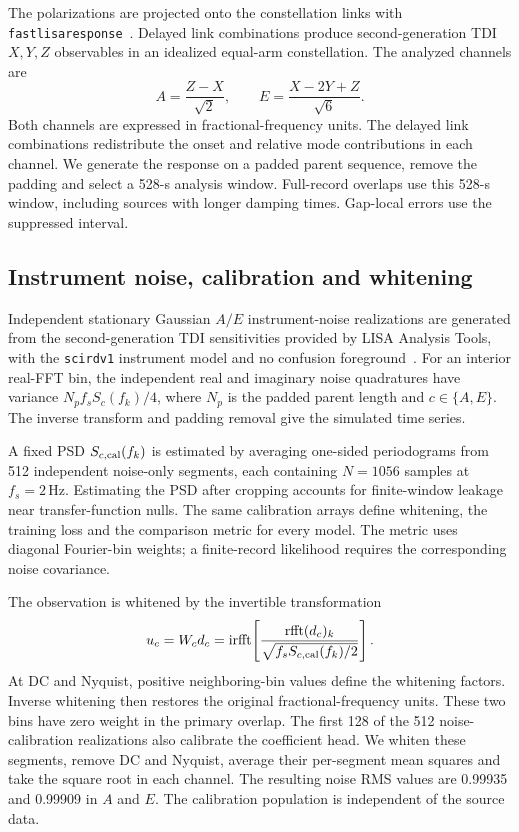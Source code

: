 \documentclass[10pt,prd,aps,a4paper,twocolumn,superscriptaddress,nofootinbib,floatfix]{revtex4-2}
\begin{document}
The polarizations are projected onto the constellation links with \texttt{fastlisaresponse}~\cite{Katz2022Response}. Delayed link combinations produce second-generation TDI $X,Y,Z$ observables in an idealized equal-arm constellation. The analyzed channels are
\begin{equation}
A=\frac{Z-X}{\sqrt{2}},\qquad E=\frac{X-2Y+Z}{\sqrt{6}}.\label{eq:aet_convention}
\end{equation}
Both channels are expressed in fractional-frequency units. The delayed link combinations redistribute the onset and relative mode contributions in each channel. We generate the response on a padded parent sequence, remove the padding and select a 528-s analysis window. Full-record overlaps use this 528-s window, including sources with longer damping times. Gap-local errors use the suppressed interval.

\subsection{Instrument noise, calibration and whitening}\label{noise model}
Independent stationary Gaussian $A/E$ instrument-noise realizations are generated from the second-generation TDI sensitivities provided by LISA Analysis Tools, with the \texttt{scirdv1} instrument model and no confusion foreground~\cite{LISAAnalysisTools}. For an interior real-FFT bin, the independent real and imaginary noise quadratures have variance $N_p f_s S_c(f_k)/4$, where $N_p$ is the padded parent length and $c\in\{A,E\}$. The inverse transform and padding removal give the simulated time series.

A fixed PSD $S_{c,\rm cal}(f_k)$ is estimated by averaging one-sided periodograms from 512 independent noise-only segments, each containing $N=1056$ samples at $f_s=2\,\mathrm{Hz}$. Estimating the PSD after cropping accounts for finite-window leakage near transfer-function nulls. The same calibration arrays define whitening, the training loss and the comparison metric for every model. The metric uses diagonal Fourier-bin weights; a finite-record likelihood requires the corresponding noise covariance.

The observation is whitened by the invertible transformation
\begin{equation}
u_c=W_cd_c=\operatorname{irfft}\!\left[
\frac{\operatorname{rfft}(d_c)_k}{\sqrt{f_sS_{c,\rm cal}(f_k)/2}}\right].\label{eq:whitening}
\end{equation}
At DC and Nyquist, positive neighboring-bin values define the whitening factors. Inverse whitening then restores the original fractional-frequency units. These two bins have zero weight in the primary overlap. The first 128 of the 512 noise-calibration realizations also calibrate the coefficient head. We whiten these segments, remove DC and Nyquist, average their per-segment mean squares and take the square root in each channel. The resulting noise RMS values are 0.99935 and 0.99909 in $A$ and $E$. The calibration population is independent of the source data.
\end{document}
